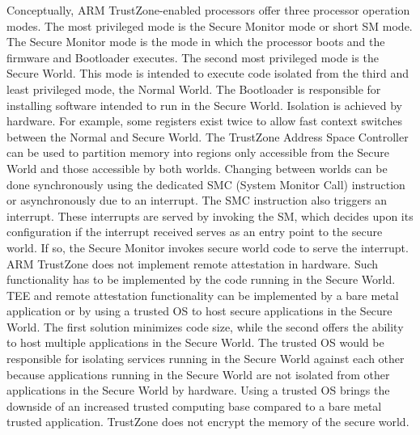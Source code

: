 Conceptually, ARM TrustZone-enabled processors offer three processor operation
modes. The most privileged mode is the Secure Monitor mode or short SM mode. The
Secure Monitor mode is the mode in which the processor boots and the firmware
and Bootloader executes. The second most privileged mode is the Secure World.
This mode is intended to execute code isolated from the third and least
privileged mode, the Normal World. The Bootloader is responsible for installing
software intended to run in the Secure World. Isolation is achieved by hardware.
For example, some registers exist twice to allow fast context switches between
the Normal and Secure World. The TrustZone Address Space Controller can be used
to partition memory into regions only accessible from the Secure World and those
accessible by both worlds. Changing between worlds can be done synchronously
using the dedicated SMC (System Monitor Call) instruction or asynchronously due
to an interrupt. The SMC instruction also triggers an interrupt. These
interrupts are served by invoking the SM, which decides upon its configuration
if the interrupt received serves as an entry point to the secure world. If so,
the Secure Monitor invokes secure world code to serve the interrupt.\\

ARM TrustZone does not implement remote attestation in hardware. Such
functionality has to be implemented by the code running in the Secure World. TEE
and remote attestation functionality can be implemented by a bare metal
application or by using a trusted OS to host secure applications in the Secure
World. The first solution minimizes code size, while the second offers the
ability to host multiple applications in the Secure World. The trusted OS would
be responsible for isolating services running in the Secure World against each
other because applications running in the Secure World are not isolated from
other applications in the Secure World by hardware. Using a trusted OS brings
the downside of an increased trusted computing base compared to a bare metal
trusted application. TrustZone does not encrypt the memory of the secure
world.\\

